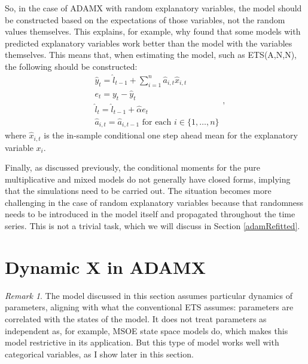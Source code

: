 \documentclass[]{book}
\theoremstyle{definition}
\theoremstyle{definition}
\theoremstyle{definition}
\theoremstyle{definition}
\theoremstyle{remark}
\newtheorem*{remark}{Remark}
\begin{document}
So, in the case of ADAMX with random explanatory variables, the model should be constructed based on the expectations of those variables, not the random values themselves. This explains, for example, why \citet{Athanasopoulos2011} found that some models with predicted explanatory variables work better than the model with the variables themselves. This means that, when estimating the model, such as ETS(A,N,N), the following should be constructed:
\begin{equation}
  \begin{aligned}
    & \hat{y}_{t} = \hat{l}_{t-1} + \sum_{i=1}^n \hat{a}_{i,t} \hat{x}_{i,t} \\
    & e_t = y_t -\hat{y}_{t} \\
    & \hat{l}_{t} = \hat{l}_{t-1} + \hat{\alpha} e_t \\
    & \hat{a}_{i,t} = \hat{a}_{i,t-1} \text{ for each } i \in \{1, \dots, n\}
  \end{aligned},
  \label{eq:ADAMETSXANNConstructed}
\end{equation}
where \(\hat{x}_{i,t}\) is the in-sample conditional one step ahead mean for the explanatory variable \(x_i\).

Finally, as discussed previously, the conditional moments for the pure multiplicative and mixed models do not generally have closed forms, implying that the simulations need to be carried out. The situation becomes more challenging in the case of random explanatory variables because that randomness needs to be introduced in the model itself and propagated throughout the time series. This is not a trivial task, which we will discuss in Section \ref{adamRefitted}.

\hypertarget{ADAMXDynamic}{%
\section{Dynamic X in ADAMX}\label{ADAMXDynamic}}

\begin{remark}
The model discussed in this section assumes particular dynamics of parameters, aligning with what the conventional ETS assumes: parameters are correlated with the states of the model. It does not treat parameters as independent as, for example, MSOE state space models do, which makes this model restrictive in its application. But this type of model works well with categorical variables, as I show later in this section.
\end{remark}
\end{document}

